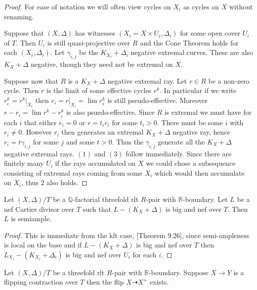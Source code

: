 	
	\begin{proof}
		
		For ease of notation we will often view cycles on $X_{i}$ as cycles on $X$ without renaming.
		
		Suppose that $(X,\Delta)$ has witnesses $(X_{i}=X \times U_{i}, \Delta_{i})$ for some open cover $U_{i}$ of $T$. Then $U_{i}$ is still quasi-projective over $R$ and the Cone Theorem holds for each $(X_{i},\Delta_{i})$. Let $\gamma_{i,j}$ be the $K_{X_{i}}+\Delta_{i}$ negative extremal curves. These are also $K_{X}+\Delta$ negative, though they need not be extremal on $X$.
		
		Suppose now that $R$ is a $K_{X}+\Delta$ negative extremal ray. Let $r\in R$ be a non-zero cycle. Then $r$ is the limit of some effective cycles $r^{k}$. In particular if we write $r^{k}_{i}=r^{k}|_{X_{i}}$ then $r_{i}=r|_{X_{i}}=\lim r^{k}_{i}$ is still pseudo-effective. Moreover $r-r_{i}=\lim r^{k}-r^{k}_{i}$ is also psuedo-effective. Since $R$ is extremal we must have for each $i$ that either $r_{i}=0$ or $r=t_{i}r_{i}$ for some $t_{i} > 0$. There must be some $i$ with $r_{i} \neq 0$. However $r_{i}$ then generates an extremal $K_{X}+\Delta$ negative ray, hence $r_{i}=t\gamma_{i,j}$ for some $j$ and some $t>0$. Thus the $\gamma_{i,j}$ generate all the $K_{X}+\Delta$ negative extremal rays. $(1)$ and $(3)$ follow immediately. Since there are finitely many $U_{i}$ if the rays accumulated on $X$ we could chose a subsequence consisting of extremal rays coming from some $X_{i}$ which would then accumulate on $X_{i}$, thus $2$ also holds.
	\end{proof}

	\begin{theorem}
		Let $(X,\Delta)/T$ be a $\mathbb{Q}$-factorial threefold rlt $R$-pair with $\mathbb{R}$-boundary. Let $L$ be a nef Cartier divisor over $T$ such that $L-(K_{X}+\Delta)$ is big and nef over $T$. Then $L$ is semiample.
	\end{theorem}
	
	\begin{proof}
		This is immediate from the klt case, \cite{bhatt2020}[Theorem 9.26], since semi-ampleness is local on the base and if $L-(K_{X}+\Delta)$ is big and nef over $T$ then $L_{X_{i}}-(K_{X_{i}}+\Delta_{i})$ is big and nef over $U_{i}$ for each $i$.
	\end{proof}

	\begin{theorem}
	Let $(X,\Delta)/T$ be a threefold rlt $R$-pair with $\mathbb{R}$-boundary. Suppose $X \to Y$ is a flipping contraction over $T$ then the flip $X \dashrightarrow X^{+}$ exists. 
	\end{theorem}

